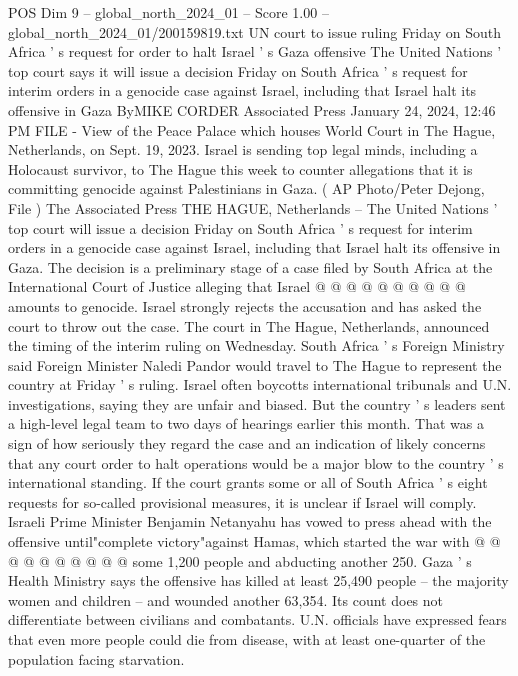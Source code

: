 \begin{textsample}{POS Dim 9 – global\_north\_2024\_01 – Score 1.00 – global\_north\_2024\_01/200159819.txt}  \label{ex:f9_pos_270}
UN court to issue ruling Friday on South Africa ' s request for order to halt Israel ' s Gaza offensive The United Nations ' top court says it will issue a decision Friday on South Africa ' s request for interim orders in a genocide case against Israel, including that Israel halt its offensive in Gaza ByMIKE CORDER Associated Press January 24, 2024, 12:46 PM FILE - View of the Peace Palace which houses World Court in The Hague, Netherlands, on Sept. 19, 2023.
Israel is sending top legal minds, including a Holocaust survivor, to The Hague this week to counter allegations that it is committing genocide against Palestinians in Gaza. ( AP Photo/Peter Dejong, File ) The Associated Press THE HAGUE, Netherlands -- The United Nations ' top court will issue a decision Friday on South Africa ' s request for interim orders in a genocide case against Israel, including that Israel halt its offensive in Gaza.
The decision is a preliminary stage of a case filed by South Africa at the International Court of Justice alleging that Israel @ @ @ @ @ @ @ @ @ @ amounts to genocide.
Israel strongly rejects the accusation and has asked the court to throw out the case.
The court in The Hague, Netherlands, announced the timing of the interim ruling on Wednesday.
South Africa ' s Foreign Ministry said Foreign Minister Naledi Pandor would travel to The Hague to represent the country at Friday ' s ruling.
Israel often boycotts international tribunals and U.N. investigations, saying they are unfair and biased.
But the country ' s leaders sent a high-level legal team to two days of hearings earlier this month.
That was a sign of how seriously they regard the case and an indication of likely concerns that any court order to halt operations would be a major blow to the country ' s international standing.
If the court grants some or all of South Africa ' s eight requests for so-called provisional measures, it is unclear if Israel will comply.
Israeli Prime Minister Benjamin Netanyahu has vowed to press ahead with the offensive until"complete victory"against Hamas, which started the war with @ @ @ @ @ @ @ @ @ @ some 1,200 people and abducting another 250.
Gaza ' s Health Ministry says the offensive has killed at least 25,490 people -- the majority women and children -- and wounded another 63,354.
Its count does not differentiate between civilians and combatants.
U.N. officials have expressed fears that even more people could die from disease, with at least one-quarter of the population facing starvation.

\end{textsample}
